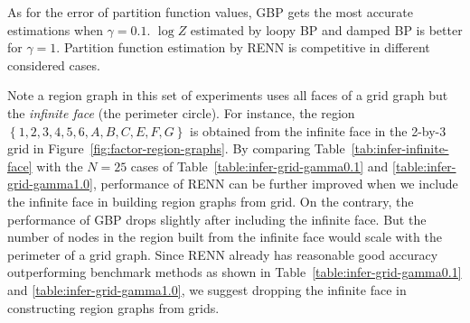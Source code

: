 \begin{table}[!tp]
\begin{adjustbox}{width=1\textwidth}
\begin{tabular}{lcccccccc}



        

        \bottomrule
      \end{tabular}
    \end{adjustbox}
\end{table}



As for the error of partition function values, GBP gets the most accurate estimations when $\gamma=0.1$. $\log{Z}$ estimated by loopy BP and damped BP is better for $\gamma=1$. Partition function estimation by RENN is competitive in different considered cases.

\sloppy Note a region graph in this set of experiments uses all faces of a grid graph but the \textit{infinite face} (the perimeter circle). For instance, the region $\left\{1, 2, 3, 4, 5, 6, A, B, C ,E, F, G\right\}$ is obtained from the infinite face in the 2-by-3 grid in Figure~\ref{fig:factor-region-graphs}. By comparing Table~\ref{tab:infer-infinite-face} with the $N=25$ cases of Table~\ref{table:infer-grid-gamma0.1} and \ref{table:infer-grid-gamma1.0}, performance of RENN can be further improved when we include the infinite face in building region graphs from grid. On the contrary, the performance of GBP drops slightly after including the infinite face. But the number of nodes in the region built from the infinite face would scale with the perimeter of a grid graph. Since RENN already has reasonable good accuracy outperforming benchmark methods as shown in Table~\ref{table:infer-grid-gamma0.1} and \ref{table:infer-grid-gamma1.0}, we suggest dropping the infinite face in constructing region graphs from grids.


